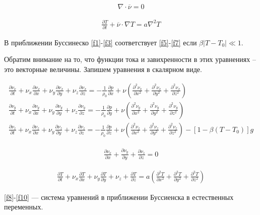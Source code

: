 \documentclass[14pt, a4paper]{article}
\begin{document}
\begin{equation}
\begin{gathered}
\label{f6}
\nabla \cdot \overline \nu = 0
\end{gathered}
\end{equation}

\begin{equation}
\begin{gathered}
\label{f7}
\frac{\partial T}{\partial t} + \overline \nu \cdot \nabla T = a \nabla^2 T
\end{gathered}
\end{equation}

В приближении Буссинеско \eqref{f1}-\eqref{f3} соответствует \eqref{f5}-\eqref{f7} если ${\beta |T-T_0| \ll 1}$.

Обратим внимание на то, что функции тока и завихренности в этих уравнениях – это векторные величины. Запишем уравнения в скалярном виде.

\begin{equation}
\begin{gathered}
\label{f8}
\frac{\partial \nu_x}{\partial t} + \nu_x\frac{\partial \nu_x}{\partial x} + \nu_y\frac{\partial \nu_x}{\partial y} + \nu_z \frac{\partial \nu_x}{\partial z} = -\frac{1}{\rho_0}\frac{\partial p}{\partial x} + \nu (\frac{\partial^2 \nu_x}{\partial x^2} + \frac{\partial^2 \nu_x}{\partial y^2} + \frac{\partial^2 \nu_x}{\partial z^2})\\
\frac{\partial \nu_y}{\partial t} + \nu_x\frac{\partial \nu_y}{\partial x} + \nu_y\frac{\partial \nu_y}{\partial y} + \nu_z \frac{\partial \nu_y}{\partial z} = -\frac{1}{\rho_0}\frac{\partial p}{\partial y} + \nu (\frac{\partial^2 \nu_y}{\partial x^2} + \frac{\partial^2 \nu_y}{\partial y^2} + \frac{\partial^2 \nu_y}{\partial z^2})\\
\frac{\partial \nu_z}{\partial t} + \nu_x\frac{\partial \nu_z}{\partial x} + \nu_y\frac{\partial \nu_z}{\partial y} + \nu_z \frac{\partial \nu_z}{\partial z} = -\frac{1}{\rho_0}\frac{\partial p}{\partial z} + \nu (\frac{\partial^2 \nu_z}{\partial x^2} + \frac{\partial^2 \nu_z}{\partial y^2} + \frac{\partial^2 \nu_z}{\partial z^2}) - [1-\beta(T-T_0)]g
\end{gathered}
\end{equation}

\begin{equation}
\begin{gathered}
\label{f9}
\frac{\partial \nu_x}{\partial x} + \frac{\partial \nu_y}{\partial y} + \frac{\partial \nu_z}{\partial z} =0
\end{gathered}
\end{equation}

\begin{equation}
\begin{gathered}
\label{f10}
\frac{\partial T}{\partial t} + \nu_x \frac{\partial T}{\partial x}+ \nu_y \frac{\partial T}{\partial y} + \nu_z + \frac{\partial T}{\partial z} = a(\frac{\partial^2 T}{\partial x^2} + \frac{\partial^2 T}{\partial y^2} + \frac{\partial^2 T}{\partial z^2})
\end{gathered}
\end{equation}

\eqref{f8}-\eqref{f10} --- система уравнений в приближении Буссиенска в естественных переменных.
\end{document}
